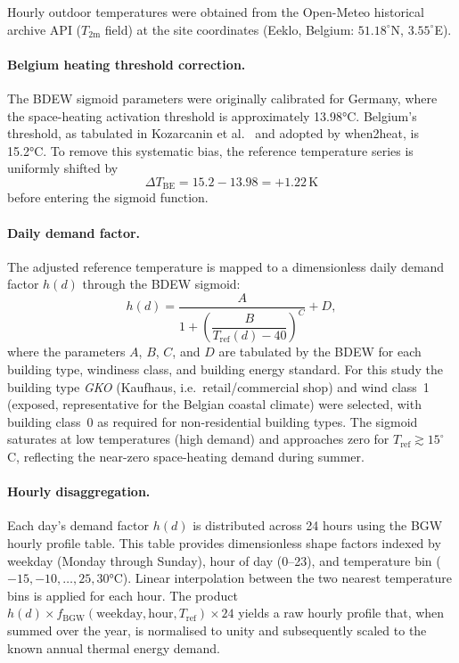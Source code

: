 \documentclass[11pt,a4paper]{report}
\begin{document}
Hourly outdoor temperatures were obtained from the Open-Meteo historical archive API ($T_\mathrm{2m}$ field) at the site coordinates (Eeklo, Belgium: $51.18^{\circ}$N, $3.55^{\circ}$E).

\paragraph{Belgium heating threshold correction.}
The BDEW sigmoid parameters were originally calibrated for Germany, where the space-heating activation threshold is approximately 13.98°C.
Belgium's threshold, as tabulated in Kozarcanin et al.\ \cite{Kozarcanin2019} and adopted by when2heat, is 15.2°C.
To remove this systematic bias, the reference temperature series is uniformly shifted by
\begin{equation}
    \Delta T_\mathrm{BE} = 15.2 - 13.98 = +1.22\,\text{K}
    \label{eq:T_offset}
\end{equation}
before entering the sigmoid function.

\paragraph{Daily demand factor.}
The adjusted reference temperature is mapped to a dimensionless daily demand factor $h(d)$ through the BDEW sigmoid:
\begin{equation}
    h(d) = \frac{A}{1 + \left(\dfrac{B}{T_\mathrm{ref}(d) - 40}\right)^C} + D,
    \label{eq:bdew_sigmoid}
\end{equation}
where the parameters $A$, $B$, $C$, and $D$ are tabulated by the BDEW for each building type, windiness class, and building energy standard.
For this study the building type \textit{GKO} (Kaufhaus, i.e.\ retail/commercial shop) and wind class~1 (exposed, representative for the Belgian coastal climate) were selected, with building class~0 as required for non-residential building types.
The sigmoid saturates at low temperatures (high demand) and approaches zero for $T_\mathrm{ref} \gtrsim 15^\circ$C, reflecting the near-zero space-heating demand during summer.

\paragraph{Hourly disaggregation.}
Each day's demand factor $h(d)$ is distributed across 24 hours using the BGW hourly profile table.
This table provides dimensionless shape factors indexed by weekday (Monday through Sunday), hour of day (0--23), and temperature bin ($-15, -10, \ldots, 25, 30$°C).
Linear interpolation between the two nearest temperature bins is applied for each hour.
The product $h(d) \times f_\mathrm{BGW}(\text{weekday}, \text{hour}, T_\mathrm{ref}) \times 24$ yields a raw hourly profile that, when summed over the year, is normalised to unity and subsequently scaled to the known annual thermal energy demand.
\end{document}

